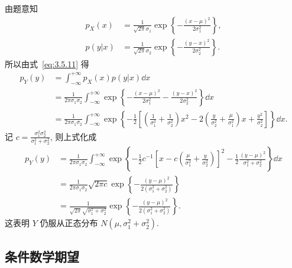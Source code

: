 	\begin{solution}
		由题意知
		\begin{align*}
			p_{X}(x)&=\frac{1}{\sqrt{2 \pi} \sigma_{1}} \exp \left\{-\frac{(x-\mu)^{2}}{2 \sigma_{1}^{2}}\right\}, \\
			p(y | x)&=\frac{1}{\sqrt{2 \pi} \sigma_{2}} \exp \left\{-\frac{(y-x)^{2}}{2 \sigma_{2}^{2}}\right\}.
		\end{align*}
		所以由式~\ref{eq:3.5.11} 得
		\begin{align*}
			p_{Y}(y) &=\int_{-\infty}^{+\infty} p_{X}(x) p(y | x) \dd x \\
			&=\frac{1}{2 \pi \sigma_{1} \sigma_{2}} \int_{-\infty}^{+\infty}\exp \left\{-\frac{(x-\mu)^{2} }
			{2 \sigma_{1}^{2}}-\frac{(y-x)^{2}}{2 \sigma_{2}^{2}}\right\} \dd x \\
			&=\frac{1}{2 \pi \sigma_{1} \sigma_{2}} \int_{-\infty}^{+\infty}
			\exp \left\{-\frac{1}{2}\left[\left(\frac{1}{\sigma_{1}^{2}}+\frac{1}{\sigma_{2}^{2}}\right) x^{2}-2\left(\frac{y}{\sigma_{2}^{2}}+\frac{\mu}{\sigma_{1}^{2}}\right) x+\frac{y^{2}}{\sigma_{2}^{2}}\right]\right\} \dd x .
		\end{align*}
		记 $c=\frac{\sigma_{1}^{2} \sigma_{2}^{2}}{\sigma_{1}^{2}+\sigma_{2}^{2}}$, 则上式化成
		\begin{align*}
			p_{Y}(y) &=\frac{1}{2 \pi \sigma_{1} \sigma_{2}} \int_{-\infty}^{+\infty} \exp \left\{-\frac{1}{2} c^{-1}\left[x-c\left(\frac{\mu}{\sigma_{1}^{2}}+\frac{y}{\sigma_{2}^{2}}\right)\right]^{2}-\frac{1}{2} \frac{(y-\mu)^{2}}{\sigma_{1}^{2}+\sigma_{2}^{2}}\right\} \dd x \\
			&=\frac{1}{2 \pi \sigma_{1} \sigma_{2}} \sqrt{2 \pi c} \exp \left\{-\frac{(y-\mu)^{2}}{2\left(\sigma_{1}^{2}+\sigma_{2}^{2}\right)}\right\}		\\
			&=\frac{1}{\sqrt{2 \pi} \sqrt{\sigma_{1}^{2}+\sigma_{2}^{2}}} \exp \left\{-\frac{(y-\mu)^{2}}{2\left(\sigma_{1}^{2}+\sigma_{2}^{2}\right)}\right\} .
		\end{align*}
		这表明 $Y$ 仍服从正态分布 $N(\mu,\sigma_1^2+\sigma_2^2)$.
	\end{solution}
	
	\subsection{条件数学期望}

